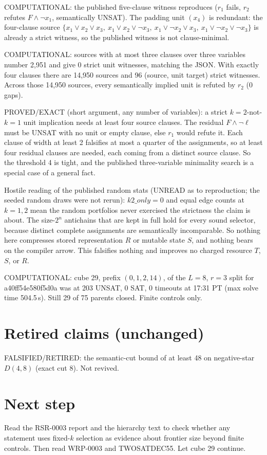 \documentclass[11pt]{article}
\begin{document}
COMPUTATIONAL: the published five-clause witness reproduces ($r_1$ fails, $r_2$ refutes $F\land\neg x_1$, semantically UNSAT). The padding unit $(x_4)$ is redundant: the four-clause source $\{x_1\lor x_2\lor x_3,\ x_1\lor x_2\lor\neg x_3,\ x_1\lor\neg x_2\lor x_3,\ x_1\lor\neg x_2\lor\neg x_3\}$ is already a strict witness, so the published witness is not clause-minimal.

COMPUTATIONAL: sources with at most three clauses over three variables number 2{,}951 and give 0 strict unit witnesses, matching the JSON. With exactly four clauses there are 14{,}950 sources and 96 (source, unit target) strict witnesses. Across those 14{,}950 sources, every semantically implied unit is refuted by $r_2$ (0 gaps).

PROVED/EXACT (short argument, any number of variables): a strict $k=2$-not-$k=1$ unit implication needs at least four source clauses. The residual $F\land\neg\ell$ must be UNSAT with no unit or empty clause, else $r_1$ would refute it. Each clause of width at least 2 falsifies at most a quarter of the assignments, so at least four residual clauses are needed, each coming from a distinct source clause. So the threshold 4 is tight, and the published three-variable minimality search is a special case of a general fact.

Hostile reading of the published random stats (UNREAD as to reproduction; the seeded random draws were not rerun): $k2\_only=0$ and equal edge counts at $k=1,2$ mean the random portfolios never exercised the strictness the claim is about. The size-$2^n$ antichains that are kept in full hold for every sound selector, because distinct complete assignments are semantically incomparable. So nothing here compresses stored representation $R$ or mutable state $S$, and nothing bears on the compiler arrow. This falsifies nothing and improves no charged resource $T$, $S$, or $R$.

COMPUTATIONAL: cube 29, prefix $(0,1,2,14)$, of the $L=8$, $r=3$ split for a40ff54e580f5d0a was at 203 UNSAT, 0 SAT, 0 timeouts at 17:31 PT (max solve time 504.5\,s). Still 29 of 75 parents closed. Finite controls only.

\section*{Retired claims (unchanged)}
FALSIFIED/RETIRED: the semantic-cut bound of at least 48 on negative-star $D(4,8)$ (exact cut 8). Not revived.

\section*{Next step}
Read the RSR-0003 report and the hierarchy text to check whether any statement uses fixed-$k$ selection as evidence about frontier size beyond finite controls. Then read WRP-0003 and TWOSATDEC55. Let cube 29 continue.
\end{document}
